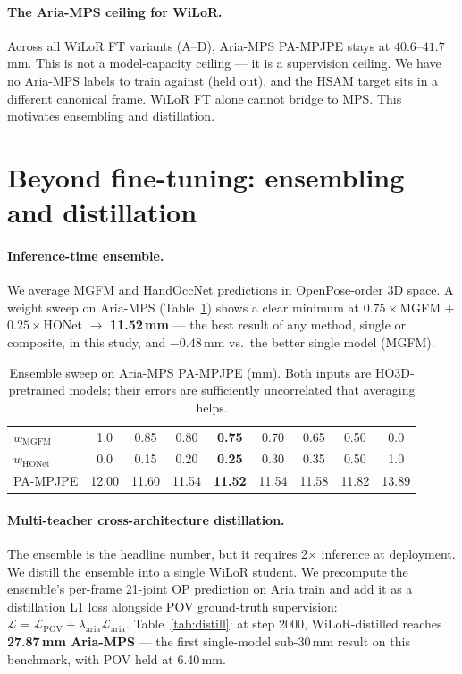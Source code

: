 \documentclass{article}
\begin{document}
\paragraph{The Aria-MPS ceiling for WiLoR.}
Across all WiLoR FT variants (A–D), Aria-MPS PA-MPJPE stays at $40.6$–$41.7$\,mm. This is not a model-capacity ceiling — it is a supervision ceiling. We have no Aria-MPS labels to train against (held out), and the HSAM target sits in a different canonical frame. WiLoR FT alone cannot bridge to MPS. This motivates ensembling and distillation.

\section{Beyond fine-tuning: ensembling and distillation}
\label{sec:beyond}

\paragraph{Inference-time ensemble.}
We average MGFM and HandOccNet predictions in OpenPose-order 3D space. A weight sweep on Aria-MPS (Table~\ref{tab:ensemble}) shows a clear minimum at $0.75 \times $MGFM + $0.25 \times $HONet $\to$ \textbf{11.52\,mm} — the best result of any method, single or composite, in this study, and $-0.48$\,mm vs.\ the better single model (MGFM).

\begin{table}[h]
\centering
\small
\caption{Ensemble sweep on Aria-MPS PA-MPJPE (mm). Both inputs are HO3D-pretrained models; their errors are sufficiently uncorrelated that averaging helps.}
\label{tab:ensemble}
\begin{tabular}{lcccccccc}
\toprule
$w_{\text{MGFM}}$ & 1.0 & 0.85 & 0.80 & \textbf{0.75} & 0.70 & 0.65 & 0.50 & 0.0 \\
$w_{\text{HONet}}$ & 0.0 & 0.15 & 0.20 & \textbf{0.25} & 0.30 & 0.35 & 0.50 & 1.0 \\
PA-MPJPE & 12.00 & 11.60 & 11.54 & \textbf{11.52} & 11.54 & 11.58 & 11.82 & 13.89 \\
\bottomrule
\end{tabular}
\end{table}

\paragraph{Multi-teacher cross-architecture distillation.}
The ensemble is the headline number, but it requires 2$\times$ inference at deployment. We distill the ensemble into a single WiLoR student. We precompute the ensemble's per-frame 21-joint OP prediction on Aria train and add it as a distillation L1 loss alongside POV ground-truth supervision: $\mathcal{L} = \mathcal{L}_{\text{POV}} + \lambda_{\text{aria}} \mathcal{L}_{\text{aria}}$. Table~\ref{tab:distill}: at step 2000, WiLoR-distilled reaches \textbf{27.87\,mm Aria-MPS} — the first single-model sub-30\,mm result on this benchmark, with POV held at 6.40\,mm.
\end{document}
